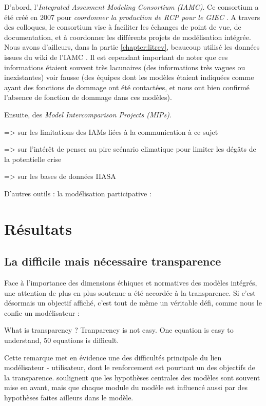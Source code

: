 D'abord, l'\emph{Integrated Assesment Modeling Consortium (IAMC)}. Ce consortium a été créé en 2007 pour \emph{coordonner la production de RCP pour le GIEC} \cite{cointe_organising_2019}. A travers des colloques, le consortium vise à faciliter les échanges de point de vue, de documentation, et à coordonner les différents projets de modélisation intégrée. Nous avons d'ailleurs, dans la partie \ref{chapter:litrev}, beaucoup utilisé les données issues du wiki de l'IAMC \cite{noauthor_models_nodate}. Il est cependant important de noter que ces informations étaient souvent très lacunaires (des informations très vagues ou inexistantes) voir fausse (des équipes dont les modèles étaient indiquées comme ayant des fonctions de dommage ont été contactées, et nous ont bien confirmé l'absence de fonction de dommage dans ces modèles). 

Ensuite, des \emph{Model Intercomparison Projects (MIPs)}.


\cite{keppo_exploring_2021} => sur les limitations des IAMs liées à la communication à ce sujet

\cite{davidson_climate_nodate} => sur l'intérêt de penser au pire scénario climatique pour limiter les dégâts de la potentielle crise


\cite{dekker_consensus_2022} => sur les bases de données IIASA
  
D'autres outils : la modélisation participative : 
\cite{etienne_modelisation_2010}






\section{Résultats}

\subsection{La difficile mais nécessaire transparence}

Face à l'importance des dimensions éthiques et normatives des modèles intégrés, une attention de plus en plus soutenue a été accordée à la transparence.  Si c'est désormais un objectif affiché, c'est tout de même un véritable défi, comme nous le confie un modélisateur : 

\begin{displayquote}
    What is transparency ? Tranparency is not easy. One equation is easy to understand, 50 equations is difficult. 
\end{displayquote}
Cette remarque met en évidence une des difficultés principale du lien modélisateur - utilisateur, dont le renforcement est pourtant un des objectifs de la transparence. \cite{keppo_exploring_2021} soulignent que les hypothèses centrales des modèles sont souvent mise en avant, mais que chaque module du modèle est influencé  aussi par des hypothèses faites ailleurs dans le modèle. \\

